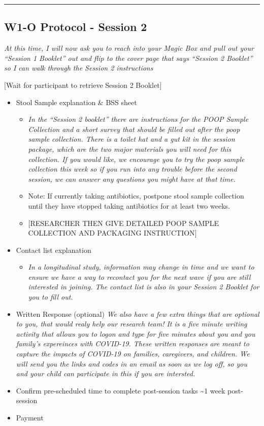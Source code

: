 \documentclass[]{book}
\providecommand{\tightlist}{%
  \setlength{\itemsep}{0pt}\setlength{\parskip}{0pt}}
\begin{document}
\begin{center}\rule{0.5\linewidth}{0.5pt}\end{center}

\hypertarget{w1-o-protocol---session-2}{%
\subsection{W1-O Protocol - Session 2}\label{w1-o-protocol---session-2}}

\emph{At this time, I will now ask you to reach into your Magic Box and pull out your ``Session 1 Booklet'' out and flip to the cover page that says ``Session 2 Booklet'' so I can walk through the Session 2 instructions}

{[}Wait for participant to retrieve Session 2 Booklet{]}

\begin{itemize}
\tightlist
\item
  Stool Sample explanation \& BSS sheet

  \begin{itemize}
  \item
    \emph{In the ``Session 2 booklet'' there are instructions for the POOP Sample Collection and a short survey that should be filled out after the poop sample collection. There is a toilet hat and a gut kit in the session package, which are the two major materials you will need for this collection. If you would like, we encourage you to try the poop sample collection this week so if you run into any trouble before the second session, we can answer any questions you might have at that time.}
  \item
    Note: If currently taking antibiotics, postpone stool sample collection until they have stopped taking antibiotics for at least two weeks.
  \item
    {[}RESEARCHER THEN GIVE DETAILED POOP SAMPLE COLLECTION AND PACKAGING INSTRUCTION{]}
  \end{itemize}
\item
  Contact list explanation

  \begin{itemize}
  \tightlist
  \item
    \emph{In a longitudinal study, information may change in time and we want to ensure we have a way to recontact you for the next wave if you are still interested in joining. The contact list is also in your Session 2 Booklet for you to fill out.}
  \end{itemize}
\item
  Written Response (optional)
  \emph{We also have a few extra things that are optional to you, that would realy help our research team! It is a five minute writing activity that allows you to logon and type for five minutes about you and you family's expereinces with COVID-19. These written responses are meant to capture the impacts of COVID-19 on families, caregivers, and children. We will send you the links and codes in an email as soon as we log off, so you and your child can participate in this if you are intersted.}
\item
  Confirm pre-scheduled time to complete post-session tasks \textasciitilde{}1 week post-session
\item
  Payment


\end{itemize}
\end{document}
